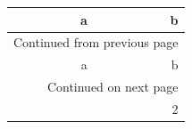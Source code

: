 \documentclass[11pt]{article}
\author{root}
\date{\today}
\title{}
\begin{document}
\tableofcontents

\begin{longtable}{rr}
\label{tab:orgadf7b3c}
\\[0pt]
\toprule
a & b\\[0pt]
\midrule
\endfirsthead
\multicolumn{2}{l}{Continued from previous page} \\[0pt]
\toprule

a & b \\[0pt]

\midrule
\endhead
\midrule\multicolumn{2}{r}{Continued on next page} \\
\endfoot
\endlastfoot
1 & 2\\[0pt]
\bottomrule
\end{longtable}
\end{document}
